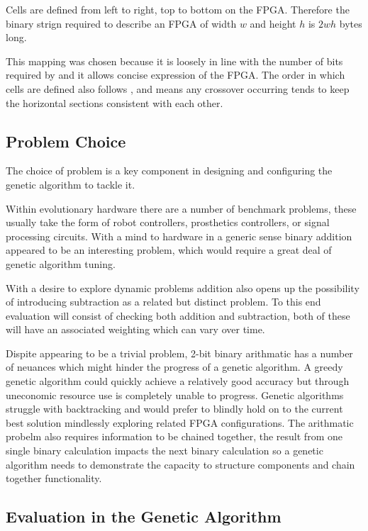 Cells are defined from left to right, top to bottom on the FPGA. Therefore the
binary strign required to describe an FPGA of width $w$ and height $h$ is $2wh$
bytes long.

This mapping was chosen because it is loosely in line with the number of bits
required by \cite{10.1007/3-540-63173-9_61} and it allows concise expression of
the FPGA. The order in which cells are defined also follows
\cite{10.1007/3-540-63173-9_61}, and means any crossover occurring tends to keep
the horizontal sections consistent with each other.

\subsection{Problem Choice}

The choice of problem is a key component in designing and configuring the genetic
algorithm to tackle it.

Within evolutionary hardware there are a number of benchmark problems, these usually
take the form of robot controllers, prosthetics controllers, or signal processing
circuits. With a mind to hardware in a generic sense binary addition appeared to be
an interesting problem, which would require a great deal of genetic algorithm tuning.

With a desire to explore dynamic problems addition also opens up the possibility of
introducing subtraction as a related but distinct problem. To this end evaluation
will consist of checking both addition and subtraction, both of these will have an
associated weighting which can
vary over time.

Dispite appearing to be a trivial problem, 2-bit binary arithmatic has a number of
neuances which might hinder the progress of a genetic algorithm. A greedy genetic
algorithm could quickly achieve a relatively good accuracy but through uneconomic
resource use is completely unable to progress. Genetic algorithms struggle with backtracking
and would prefer to blindly hold on to the current best solution mindlessly exploring
related FPGA configurations. The arithmatic probelm also requires information to be
chained together, the result from one single binary calculation impacts the next binary
calculation so a genetic algorithm needs to demonstrate the capacity to structure
components and chain together functionality.

\subsection{Evaluation in the Genetic Algorithm}

